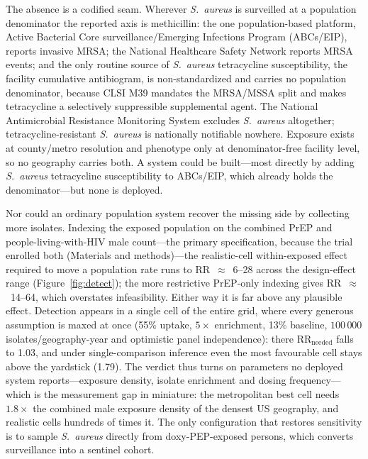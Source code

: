 \documentclass[12pt,a4paper]{article}
\newcommand{\sa}{\emph{S.~aureus}}
\begin{document}
The absence is a codified seam. Wherever \sa{} is surveilled at a population
denominator the reported axis is methicillin: the one population-based platform,
Active Bacterial Core surveillance/Emerging Infections Program (ABCs/EIP),
reports invasive MRSA; the National Healthcare Safety Network reports MRSA events;
and the only routine source of \sa{} tetracycline susceptibility, the facility
cumulative antibiogram, is non-standardized and carries no population
denominator, because CLSI M39 mandates the MRSA/MSSA split and makes tetracycline
a selectively suppressible supplemental agent. The National Antimicrobial
Resistance Monitoring System excludes \sa{} altogether; tetracycline-resistant
\sa{} is nationally notifiable nowhere. Exposure exists at county/metro
resolution and phenotype only at denominator-free facility level, so no geography
carries both. A system could be built---most directly by adding \sa{} tetracycline
susceptibility to ABCs/EIP, which already holds the denominator---but none is
deployed.

Nor could an ordinary population system recover the missing side by collecting
more isolates. Indexing the exposed population on the combined PrEP and
people-living-with-HIV male count---the primary specification, because the trial
enrolled both (Materials and methods)---the realistic-cell within-exposed effect
required to move a population rate runs to RR~$\approx$~6--28 across the
design-effect range (Figure~\ref{fig:detect}); the more restrictive PrEP-only
indexing gives RR~$\approx$~14--64, which overstates infeasibility. Either way it
is far above any plausible effect. Detection appears in a single
cell of the entire grid, where every generous assumption is maxed at once (55\%
uptake, $5\times$ enrichment, 13\% baseline, $100\,000$ isolates/geography-year
and optimistic panel independence): there $\mathrm{RR_{needed}}$ falls to 1.03,
and under single-comparison inference even the most favourable cell stays above
the yardstick (1.79). The verdict thus turns on parameters no deployed system
reports---exposure density, isolate enrichment and dosing frequency---which is the
measurement gap in miniature: the metropolitan best cell needs $1.8\times$ the
combined male exposure density of the densest US geography, and realistic cells
hundreds of times it. The only configuration that restores sensitivity is to
sample \sa{} directly from doxy-PEP-exposed persons, which converts surveillance
into a sentinel cohort.
\end{document}
